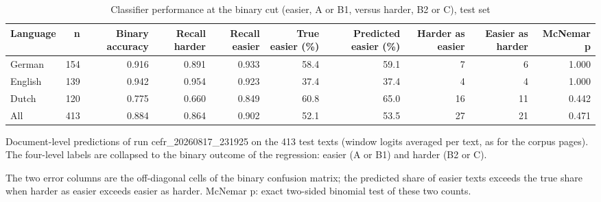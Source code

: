 \begin{table}[htbp]
\centering
\small
\begin{threeparttable}
\caption{Classifier performance at the binary cut (easier, A or B1, versus harder, B2 or C), test set}
\label{tab:clf-binary-cut}
\begin{tabular}{lrrrrrrrrr}
\hline
Language & n & Binary accuracy & Recall harder & Recall easier & True easier (\%) & Predicted easier (\%) & Harder as easier & Easier as harder & McNemar p \\
\hline
German & 154 & 0.916 & 0.891 & 0.933 & 58.4 & 59.1 & 7 & 6 & 1.000 \\
English & 139 & 0.942 & 0.954 & 0.923 & 37.4 & 37.4 & 4 & 4 & 1.000 \\
Dutch & 120 & 0.775 & 0.660 & 0.849 & 60.8 & 65.0 & 16 & 11 & 0.442 \\
\hline
All & 413 & 0.884 & 0.864 & 0.902 & 52.1 & 53.5 & 27 & 21 & 0.471 \\
\hline
\end{tabular}
\begin{tablenotes}
\footnotesize
\item Document-level predictions of run cefr\_20260817\_231925 on the 413 test texts (window logits averaged per text, as for the corpus pages). The four-level labels are collapsed to the binary outcome of the regression: easier (A or B1) and harder (B2 or C).
\item The two error columns are the off-diagonal cells of the binary confusion matrix; the predicted share of easier texts exceeds the true share when harder as easier exceeds easier as harder. McNemar p: exact two-sided binomial test of these two counts.
\end{tablenotes}
\end{threeparttable}
\end{table}
